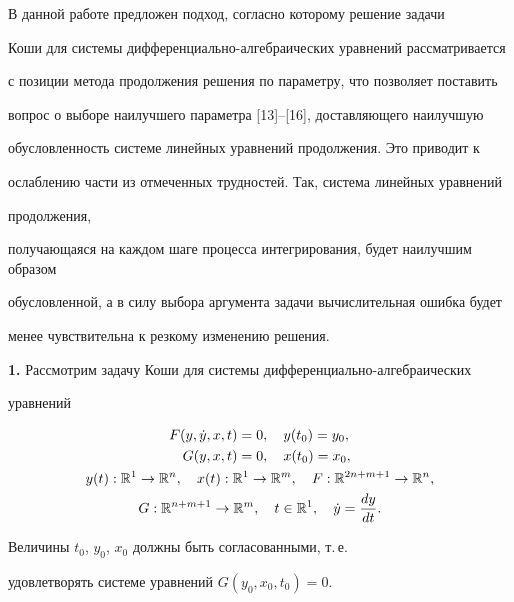В данной работе предложен подход, согласно которому решение задачи


Коши для системы дифференциально-алгебраических уравнений рассматривается


с позиции метода продолжения решения по параметру, что позволяет поставить


вопрос о выборе наилучшего параметра [13]--[16], доставляющего наилучшую


обусловленность системе линейных уравнений продолжения. Это приводит к


ослаблению части из отмеченных трудностей. Так, система линейных уравнений


продолжения,


получающаяся на каждом шаге процесса интегрирования, будет наилучшим образом


обусловленной, а в силу выбора аргумента задачи вычислительная ошибка будет


менее чувствительна к резкому изменению решения.


\medskip





{\bf 1.} Рассмотрим задачу Коши для системы дифференциально-алгебраических


уравнений


\begin{gather}


\begin{split}


F(y,\Dot y,x,t)&=0,\quad y(t_0)=y_0,\\


G(y,x,t)&=0,\quad x(t_0)=x_0,


\end{split}


\\


y(t):\R^1\to \R^n,\quad x(t):\R^1\to \R^m,\quad


F:\R^{2n+m+1}\to \R^n,\notag \\


G:\R^{n+m+1}\to \R^m,\quad


t\in\R^1,\quad \Dot y=\derhd{y}{t}.\notag


\end{gather}


Величины $t_0$, $y_0$, $x_0$ должны быть согласованными, т.\,е.


удовлетворять  системе уравнений $G(y_0,x_0,t_0)=0$.





